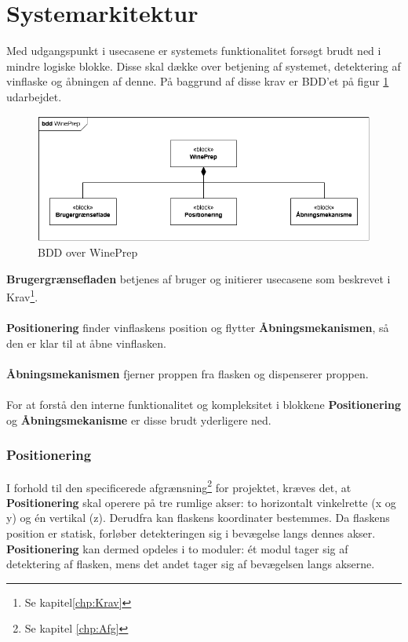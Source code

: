 \section{Systemarkitektur}
\label{sec:Arkitektur}
Med udgangspunkt i usecasene er systemets funktionalitet forsøgt brudt ned i mindre logiske blokke. Disse skal dække over betjening af systemet, detektering af vinflaske og åbningen af denne. På baggrund af disse krav er BDD'et på figur \ref{BDD_WinePrep} udarbejdet.

\begin{figure}[H]
	\centerline{\includegraphics[scale=0.33]{tex/Arkitektur/Diagrammer/BDD_WinePrep}}
	\caption{BDD over WinePrep}
	\label{BDD_WinePrep}
\end{figure}

\noindent\textbf{Brugergrænsefladen} betjenes af bruger og initierer usecasene som beskrevet i Krav\footnote{Se kapitel\ref{chp:Krav}}.
\\
\\
\textbf{Positionering} finder vinflaskens position og flytter \textbf{Åbningsmekanismen}, så den er klar til at åbne vinflasken.
\\
\\
\textbf{Åbningsmekanismen} fjerner proppen fra flasken og dispenserer proppen.
\\
\\
For at forstå den interne funktionalitet og kompleksitet i blokkene \textbf{Positionering} og \textbf{Åbningsmekanisme} er disse brudt yderligere ned.

\subsubsection{Positionering}
I forhold til den specificerede afgrænsning\footnote{Se kapitel \ref{chp:Afg}} for projektet, kræves det, at \textbf{Positionering} skal operere på tre rumlige akser: to horizontalt vinkelrette (x og y) og én vertikal (z). Derudfra kan flaskens koordinater bestemmes. Da flaskens position er statisk, forløber detekteringen sig i bevægelse langs dennes akser. \textbf{Positionering} kan dermed opdeles i to moduler: ét modul tager sig af detektering af flasken, mens det andet tager sig af bevægelsen langs akserne.

